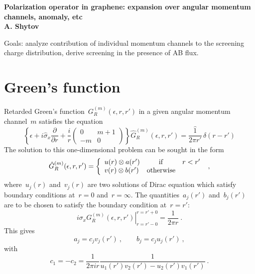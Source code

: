 \documentclass[preprint,aps,prb]{revtex4}
\begin{document}
\begin{center}
{\LARGE\bf
Polarization operator in graphene: expansion over angular momentum
channels, anomaly, etc}
\\
{\bf A. Shytov}
\end{center}

Goals: analyze contribution of individual momentum channels 
to the screening charge distribution, derive screening
in the presence of AB flux.

\section{Green's function}

Retarded Green's function~$G_{R}^{(m)}(\epsilon, r, r')$
in a given angular momentum channel~$m$ satisfies the equation
\begin{equation}
\left\{ 
\epsilon + i {\hat\sigma_x} \frac{\partial}{\partial r}
+ \frac{i}{r} \left(
\begin{array}{cc}
0 & m + 1\\
-m  & 0
\end{array}
\right)
\right\}
\hat{G}_R^{(m)}(\epsilon, r, r') = \frac{\hat{1}}{2\pi r'}\, \delta (r - r')
\end{equation}
The solution to this one-dimensional problem 
can be sought in the form
\begin{equation}
{\hat G}^{(m)}_{R}(\epsilon, r, r') = 
\left\{ 
\begin{array}{lcr}
u (r) \otimes a (r') & {\rm if} & {r < r'} \\
v (r) \otimes b (r') & {\rm otherwise} &
\end{array}
\right.
\ , 
\end{equation}
where~$u_j(r)$ and~$v_j(r)$ are two solutions of Dirac equation which
satisfy boundary conditions at~$r = 0$ and~$r = \infty$. 
The quantities~$a_j(r')$ and~$b_j(r')$ are to be chosen to satisfy
the boundary condition at~$r = r'$:
\begin{equation}
i \sigma_x \left. G_R^{(m)}(\epsilon, r, r') \right|_{r = r'-0}^{r =
r'+0} = \frac{1}{2\pi r}
\ .
\end{equation}
This gives
\begin{equation}
a_j = c_j v_j(r') \ , \qquad b_j = c_j u_j(r') \ ,  
\end{equation}
with
\begin{equation}
\label{c-eq}
c_1 = - c_2 = \frac{1}{2\pi i r} 
\frac{1}{u_1(r') v_2(r') - u_2(r') v_1(r')}
\ .
\end{equation}
\end{document}
